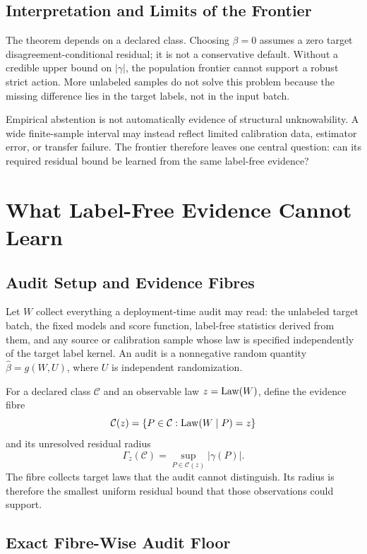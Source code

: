 \subsection{Interpretation and Limits of the Frontier}

The theorem depends on a declared class. Choosing $\beta=0$ assumes a zero target
disagreement-conditional residual; it is not a conservative default. Without a credible upper bound on $|\gamma|$, the
population frontier cannot support a robust strict action. More unlabeled samples do not solve this
problem because the missing difference lies in the target labels, not in the input batch.

Empirical abstention is not automatically evidence of structural unknowability. A wide finite-sample
interval may instead reflect limited calibration data, estimator error, or transfer failure. The
frontier therefore leaves one central question: can its required residual bound be learned from the
same label-free evidence?

\section{What Label-Free Evidence Cannot Learn}
\label{sec:compact-budget}

\subsection{Audit Setup and Evidence Fibres}

Let $W$ collect everything a deployment-time audit may read: the unlabeled target batch, the fixed
models and score function, label-free statistics derived from them, and any source or calibration
sample whose law is specified independently of the target label kernel. An audit is a nonnegative
random quantity $\widehat\beta=g(W,U)$, where $U$ is independent randomization.

For a declared class $\mathcal C$ and an observable law $z=\mathrm{Law}(W)$, define the evidence fibre
\[
 \mathcal C(z)=\{P\in\mathcal C:\mathrm{Law}(W\mid P)=z\}
\]
and its unresolved residual radius
\begin{equation}
 \Gamma_z(\mathcal C)=\sup_{P\in\mathcal C(z)}|\gamma(P)|.
 \label{eq:compact-fibre-radius}
\end{equation}
The fibre collects target laws that the audit cannot distinguish. Its radius is therefore the
smallest uniform residual bound that those observations could support.

\subsection{Exact Fibre-Wise Audit Floor}

